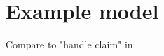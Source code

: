 \section{Example model \label{sec:example}}

Compare to "handle claim"  in \cite{iacob_model-driven_2008}